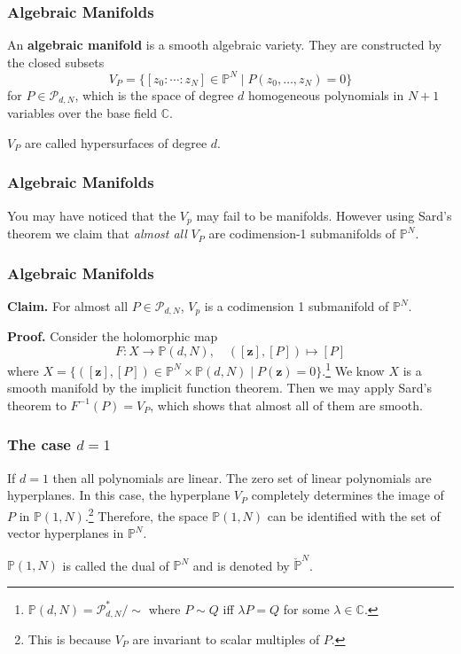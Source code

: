 \documentclass{beamer}
\begin{document}
\begin{frame}
\frametitle{Algebraic Manifolds}

An \textbf{algebraic manifold} is a smooth algebraic variety. They are constructed by the closed subsets \[V_P = \{[z_0 : \cdots : z_N] \in \mathbb{P}^N \mid P(z_0,\ldots,z_N) = 0\}\] for $P \in \mathcal{P}_{d,N}$, which is the space of degree $d$ homogeneous polynomials in $N+1$ variables over the base field $\mathbb{C}$.

\phantom{?}

$V_P$ are called hypersurfaces of degree $d$.

\end{frame}

\begin{frame}
\frametitle{Algebraic Manifolds}


You may have noticed that the $V_p$ may fail to be manifolds. However using Sard's theorem we claim that \textit{almost all} $V_P$ are codimension-1 submanifolds of $\mathbb{P}^N$.


\end{frame}

\begin{frame}
\frametitle{Algebraic Manifolds}

\textbf{Claim.} For almost all $P \in \mathcal{P}_{d,N}$, $V_p$ is a codimension 1 submanifold of $\mathbb{P}^N$.

\textbf{Proof.} Consider the holomorphic map \[F : X \to \mathbb{P}(d,N), \quad ([\mathbf{z}],[P]) \mapsto [P]\] where $X = \{([\mathbf{z}],[P])\in \mathbb{P}^N \times \mathbb{P}(d,N) \mid P(\mathbf{z}) = 0\}$.\footnote{$\mathbb{P}(d,N) = \mathcal{P}_{d,N}^*/\sim$ where $P \sim Q$ iff $\lambda P = Q$ for some $\lambda \in \mathbb{C}$.} We know $X$ is a smooth manifold by the implicit function theorem. Then we may apply Sard's theorem to $F^{-1}(P) = V_P$, which shows that almost all of them are smooth.
\end{frame}

\begin{frame}
\frametitle{The case $d=1$}

If $d=1$ then all polynomials are linear. The zero set of linear polynomials are hyperplanes. In this case, the hyperplane $V_P$ completely determines the image of $P$ in $\mathbb{P}(1,N)$.\footnote{This is because $V_P$ are invariant to scalar multiples of $P$.} Therefore, the space $\mathbb{P}(1,N)$ can be identified with the set of vector hyperplanes in $\mathbb{P}^N$.

\phantom{?}

$\mathbb{P}(1,N)$ is called the dual of $\mathbb{P}^N$ and is denoted by $\check{\mathbb{P}}^N$.

\end{frame}
\end{document}
